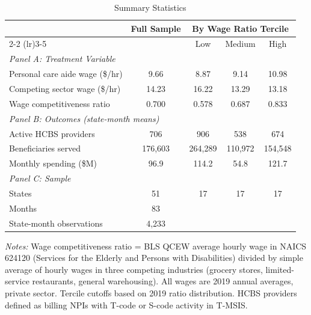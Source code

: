 \begin{table}[htbp]
\centering
\caption{Summary Statistics}
\label{tab:summary}
\begin{tabular}{lcccc}
\toprule
 & \multicolumn{1}{c}{Full Sample} & \multicolumn{3}{c}{By Wage Ratio Tercile} \\
\cmidrule(lr){2-2} \cmidrule(lr){3-5}
 & & Low & Medium & High \\
\midrule
\multicolumn{5}{l}{\textit{Panel A: Treatment Variable}} \\
Personal care aide wage (\$/hr) & 9.66 & 8.87 & 9.14 & 10.98 \\
Competing sector wage (\$/hr) & 14.23 & 16.22 & 13.29 & 13.18 \\
Wage competitiveness ratio & 0.700 & 0.578 & 0.687 & 0.833 \\
[4pt]
\multicolumn{5}{l}{\textit{Panel B: Outcomes (state-month means)}} \\
Active HCBS providers & 706 & 906 & 538 & 674 \\
Beneficiaries served & 176,603 & 264,289 & 110,972 & 154,548 \\
Monthly spending (\$M) & 96.9 & 114.2 & 54.8 & 121.7 \\
[4pt]
\multicolumn{5}{l}{\textit{Panel C: Sample}} \\
States & 51 & 17 & 17 & 17 \\
Months & 83 & & & \\
State-month observations & 4,233 & & & \\
\bottomrule
\end{tabular}
\begin{tablenotes}[flushleft]\small
\item \textit{Notes:} Wage competitiveness ratio = BLS QCEW average hourly wage in NAICS 624120 (Services for the Elderly and Persons with Disabilities) divided by simple average of hourly wages in three competing industries (grocery stores, limited-service restaurants, general warehousing). All wages are 2019 annual averages, private sector. Tercile cutoffs based on 2019 ratio distribution. HCBS providers defined as billing NPIs with T-code or S-code activity in T-MSIS.
\end{tablenotes}
\end{table}
